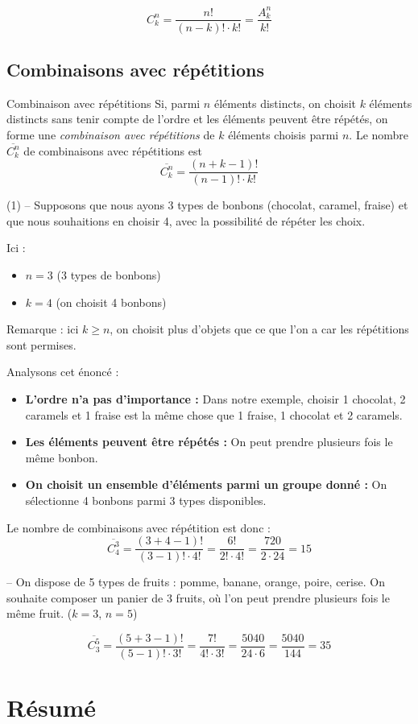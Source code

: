 \documentclass[a4paper,12pt]{article}
\begin{document}
\begin{remarque}
	\tcblower
	\[C_k^n = \frac{n!}{(n-k)! \cdot k!} = \frac{A_k^n}{k!}\]
\end{remarque}

\subsection{Combinaisons avec répétitions}

\begin{definition}
	Combinaison avec répétitions
	\tcblower
	Si, parmi $n$ éléments distincts, on choisit $k$ éléments distincts sans tenir compte de l'ordre et les éléments peuvent être répétés, on forme une \emph{combinaison avec répétitions} de $k$ éléments choisis parmi $n$. Le nombre $\overline{C_k^n}$ de combinaisons avec répétitions est
	\[\overline{C_k^n} = \frac{(n+k-1)!}{(n-1)! \cdot k!}\]
\end{definition}

\begin{exemple}
	\tcblower
	\begin{tasks}(1)
		 -- Supposons que nous ayons 3 types de bonbons (chocolat, caramel, fraise) et que nous souhaitions en choisir 4, avec la possibilité de répéter les choix.

		Ici :
		\begin{itemize}
			\item $n = 3$ (3 types de bonbons)
			\item $k = 4$ (on choisit 4 bonbons)
		\end{itemize}

		Remarque : ici $k \geq n$, on choisit plus d'objets que ce que l'on a car les répétitions sont permises.

		Analysons cet énoncé :
		\begin{itemize}
			\item {\bfseries L'ordre n'a pas d'importance :} Dans notre exemple, choisir 1 chocolat, 2 caramels et 1 fraise est la même chose que 1 fraise, 1 chocolat et 2 caramels.
			\item {\bfseries Les éléments peuvent être répétés :} On peut prendre plusieurs fois le même bonbon.
			\item {\bfseries On choisit un ensemble d'éléments parmi un groupe donné :} On sélectionne 4 bonbons parmi 3 types disponibles.
		\end{itemize}

		Le nombre de combinaisons avec répétition est donc :
		\[\overline{C_4^3} = \frac{(3+4-1)!}{(3-1)! \cdot 4!} = \frac{6!}{2! \cdot 4!} = \frac{720}{2 \cdot 24} = 15\]

		 -- On dispose de 5 types de fruits : pomme, banane, orange, poire, cerise. On souhaite composer un panier de 3 fruits, où l'on peut prendre plusieurs fois le même fruit. ($k = 3$, $n = 5$)

		\[\overline{C_3^5} = \frac{(5+3-1)!}{(5-1)! \cdot 3!} = \frac{7!}{4! \cdot 3!} = \frac{5040}{24 \cdot 6} = \frac{5040}{144} = 35\]
	\end{tasks}
\end{exemple}



\section{Résumé}




\newpage
\end{document}
